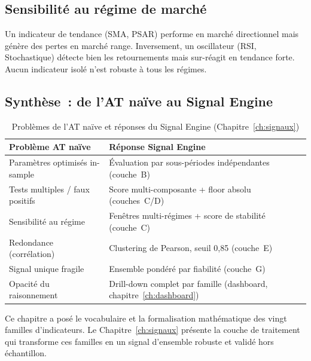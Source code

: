 \subsection{Sensibilité au régime de marché}

Un indicateur de tendance (SMA, PSAR) performe en marché directionnel mais génère
des pertes en marché range. Inversement, un oscillateur (RSI, Stochastique) détecte
bien les retournements mais sur-réagit en tendance forte. Aucun indicateur isolé
n'est robuste à tous les régimes.

\subsection{Synthèse~: de l'AT naïve au Signal Engine}

\begin{table}[H]
\centering
\caption{Problèmes de l'AT naïve et réponses du Signal Engine (Chapitre~\ref{ch:signaux})}
\label{tab:at_vs_signalengine}
\begin{tabularx}{\linewidth}{p{4.5cm} X}
\toprule
\textbf{Problème AT naïve} & \textbf{Réponse Signal Engine} \\
\midrule
Paramètres optimisés in-sample   & Évaluation par sous-périodes indépendantes (couche~B) \\
Tests multiples / faux positifs  & Score multi-composante + floor absolu (couches~C/D) \\
Sensibilité au régime            & Fenêtres multi-régimes + score de stabilité (couche~C) \\
Redondance (corrélation)         & Clustering de Pearson, seuil 0{,}85 (couche~E) \\
Signal unique fragile            & Ensemble pondéré par fiabilité (couche~G) \\
Opacité du raisonnement          & Drill-down complet par famille (dashboard, chapitre~\ref{ch:dashboard}) \\
\bottomrule
\end{tabularx}
\end{table}

\medskip

\noindent Ce chapitre a posé le vocabulaire et la formalisation mathématique des vingt
familles d'indicateurs. Le Chapitre~\ref{ch:signaux} présente la couche de traitement
qui transforme ces familles en un signal d'ensemble robuste et validé hors échantillon.
